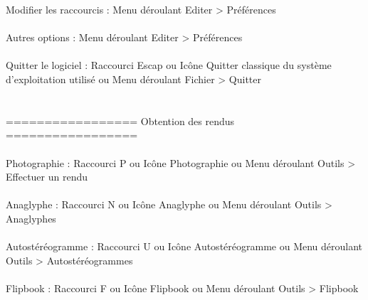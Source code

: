 Modifier les raccourcis :		Menu déroulant Editer > Préférences
\\ \\
Autres options :			Menu déroulant Editer > Préférences
\\ \\
Quitter le logiciel :			Raccourci Escap
	   	    			ou Icône Quitter classique du système d'exploitation utilisé
					ou Menu déroulant Fichier > Quitter
\\ \\ \\
================= Obtention des rendus =================
\\ \\
Photographie :	  	    	        Raccourci P
	     				ou     Icône Photographie
					ou     Menu déroulant Outils > Effectuer un rendu
\\ \\
Anaglyphe :	  	    	        Raccourci N
	     				ou     Icône Anaglyphe
					ou     Menu déroulant Outils > Anaglyphes
\\ \\
Autostéréogramme :	  	    	Raccourci U
	     				ou     Icône Autostéréogramme
					ou     Menu déroulant Outils > Autostéréogrammes
\\ \\
Flipbook :	  	    	        Raccourci F
	     				ou     Icône Flipbook
					ou     Menu déroulant Outils > Flipbook
